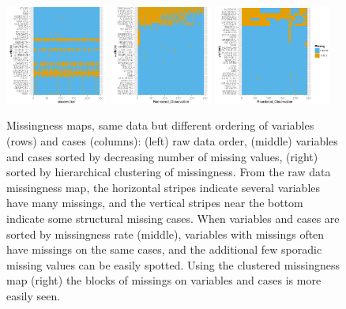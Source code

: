 \documentclass[article]{jss}
\begin{document}
\begin{center}
\begin{figure}[h]
\begin{centering}
\includegraphics[width=0.3\textwidth]{graph/fig5-3-missingmap-1}
\includegraphics[width=0.3\textwidth]{graph/fig5-3-missingmap-2}
\includegraphics[width=0.345\textwidth]{graph/fig5-3-missingmap-3}
\par\end{centering}
\caption{Missingness maps, same data but different ordering of variables (rows) and cases (columns): (left) raw data order, (middle) variables and cases sorted by decreasing number of missing values, (right) sorted by hierarchical clustering of missingness. From the raw data missingness map, the horizontal stripes indicate several variables have many missings, and the vertical stripes near the bottom indicate some structural missing cases. When variables and cases are sorted by missingness rate (middle), variables with missings often have missings on the same cases, and the additional few sporadic missing values can be easily spotted. Using the clustered missingness map (right) the blocks of missings on variables and cases is more easily seen.}
\label{fig:missingmap}
\end{figure}
\par\end{center}
\end{document}
